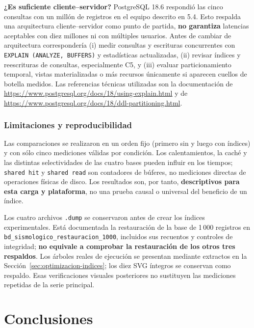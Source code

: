 \documentclass[12pt,a4paper]{article}
\begin{document}
\textbf{¿Es suficiente cliente--servidor?} PostgreSQL 18.6 respondió
las cinco consultas con un millón de registros en el equipo descrito
en 5.4. Esto respalda una arquitectura cliente--servidor como punto
de partida, \textbf{no garantiza} latencias aceptables con diez
millones ni con múltiples usuarios. Antes de cambiar de arquitectura
correspondería (i) medir consultas y escrituras concurrentes con
\texttt{EXPLAIN (ANALYZE, BUFFERS)} y estadísticas actualizadas,
(ii) revisar índices y reescrituras de consultas, especialmente C5,
y (iii) evaluar particionamiento temporal, vistas materializadas o
más recursos únicamente si aparecen cuellos de botella medidos.
Las referencias técnicas utilizadas son la documentación de
\url{https://www.postgresql.org/docs/18/using-explain.html} y de
\url{https://www.postgresql.org/docs/18/ddl-partitioning.html}.

\subsubsection{Limitaciones y reproducibilidad}
\label{sec:limitaciones-global-56}

Las comparaciones se realizaron en un orden fijo (primero sin y
luego con índices) y con sólo cinco mediciones válidas por condición.
Los calentamientos, la caché y las distintas selectividades de las
cuatro bases pueden influir en los tiempos; \texttt{shared hit} y
\texttt{shared read} son contadores de búferes, no mediciones directas
de operaciones físicas de disco. Los resultados son, por tanto,
\textbf{descriptivos para esta carga y plataforma}, no una prueba
causal o universal del beneficio de un índice.

Los cuatro archivos \texttt{.dump} se conservaron antes de crear los
índices experimentales. Está documentada la restauración de la base
de 1\,000 registros en
\nolinkurl{bd_sismologico_restauracion_1000}, incluidos sus recuentos
y controles de integridad; \textbf{no equivale a comprobar la
restauración de los otros tres respaldos}. Los árboles reales de ejecución se presentan mediante extractos
en la Sección~\ref{sec:optimizacion-indices}; los diez SVG íntegros
se conservan como respaldo. Esas verificaciones visuales posteriores
no sustituyen las mediciones repetidas de la serie principal.

\clearpage
\section{Conclusiones}
\end{document}
